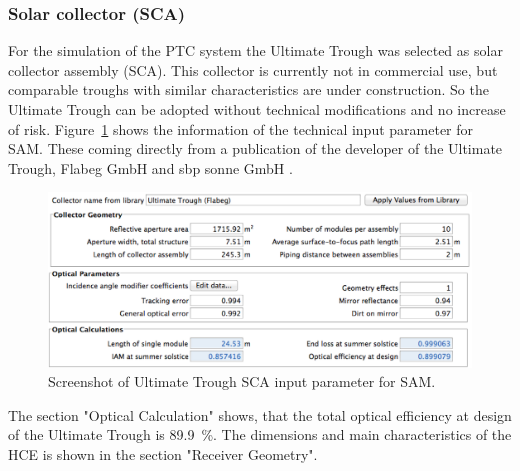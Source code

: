 \subsubsection{Solar collector (SCA)}
For the simulation of the PTC system the Ultimate Trough was selected as solar collector assembly (SCA). This collector is currently not in commercial use, but comparable troughs with similar characteristics are under construction. So the Ultimate Trough can be adopted  without technical modifications and no increase of risk. Figure~\ref{PTC_Ultimate_config} shows the information of the technical input parameter for SAM. These coming directly from a publication of the developer of the Ultimate Trough, Flabeg GmbH and sbp sonne GmbH \cite{Riffelmann2014}. 
\begin{figure}[bhtp]
\centering
\includegraphics[width=0.95\linewidth]{FIG/PTC_Ultimate_config}
\caption[Screenshot of Ultimate Trough SCA input parameter for SAM.]{Screenshot of Ultimate Trough SCA input parameter for SAM.}\label{PTC_Ultimate_config}
\end{figure}
The section "Optical Calculation" shows, that the total optical efficiency at design of the Ultimate Trough is 89.9~\%. The dimensions and main characteristics of the HCE is shown in the section "Receiver Geometry".
